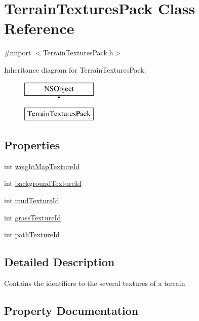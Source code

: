 \hypertarget{interface_terrain_textures_pack}{}\section{Terrain\+Textures\+Pack Class Reference}
\label{interface_terrain_textures_pack}


{\ttfamily \#import $<$Terrain\+Textures\+Pack.\+h$>$}

Inheritance diagram for Terrain\+Textures\+Pack\+:\begin{figure}[H]
\begin{center}
\leavevmode
\includegraphics[height=2.000000cm]{interface_terrain_textures_pack}
\end{center}
\end{figure}
\subsection*{Properties}
\begin{DoxyCompactItemize}
\item 
int \hyperlink{interface_terrain_textures_pack_aaff06a2e112ae5f534b3bdd4804e7659}{weight\+Map\+Texture\+Id}
\item 
int \hyperlink{interface_terrain_textures_pack_aaf22ea7a7c4b7a9bea89865b86472cd8}{background\+Texture\+Id}
\item 
int \hyperlink{interface_terrain_textures_pack_a293f99431d498c17bdf6f20bb9842a8e}{mud\+Texture\+Id}
\item 
int \hyperlink{interface_terrain_textures_pack_aeb36cd29e8a709d1c334cf6b7422bfa1}{grass\+Texture\+Id}
\item 
int \hyperlink{interface_terrain_textures_pack_af893c59088e91ded731cb431df095a64}{path\+Texture\+Id}
\end{DoxyCompactItemize}


\subsection{Detailed Description}
Contains the identifiers to the several textures of a terrain 

\subsection{Property Documentation}
